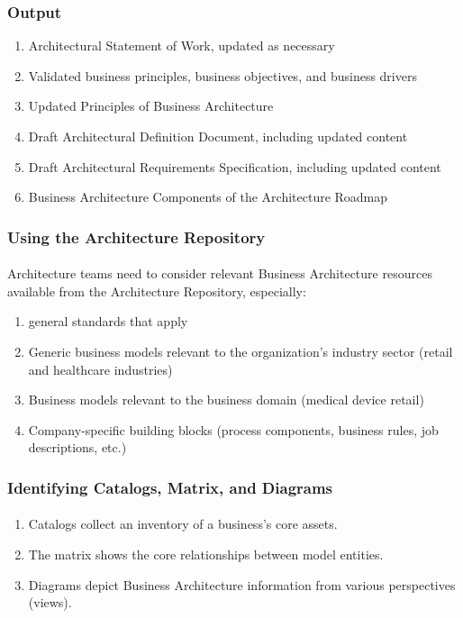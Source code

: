 \documentclass[aspectratio=169, table]{beamer}
\begin{document}
    \begin{frame}
        \frametitle{Output}
        \begin{enumerate}
            \item Architectural Statement of Work, updated as necessary
            \item Validated business principles, business objectives, and business drivers
            \item Updated Principles of Business Architecture
            \item Draft Architectural Definition Document, including updated content
            \item Draft Architectural Requirements Specification, including updated content
            \item Business Architecture Components of the Architecture Roadmap
        \end{enumerate}
    \end{frame}

    \begin{frame}
        \frametitle{Using the Architecture Repository}
        \framesubtitle{\hspace{1cm}}
        Architecture teams need to consider relevant Business Architecture resources available from the Architecture Repository, especially:
        \begin{enumerate}
            \item general standards that apply
            \item Generic business models relevant to the organization's industry sector (retail and healthcare industries)
            \item Business models relevant to the business domain (medical device retail)
            \item Company-specific building blocks (process components, business rules, job descriptions, etc.)

        \end{enumerate}
    \end{frame}


    \begin{frame}
        \frametitle{Identifying Catalogs, Matrix, and Diagrams}
        \framesubtitle{\hspace{1cm}}
        \begin{enumerate}
            \item Catalogs collect an inventory of a business's core assets.
            \item The matrix shows the core relationships between model entities.
            \item Diagrams depict Business Architecture information from various perspectives (views).
        \end{enumerate}
    \end{frame}
\end{document}

